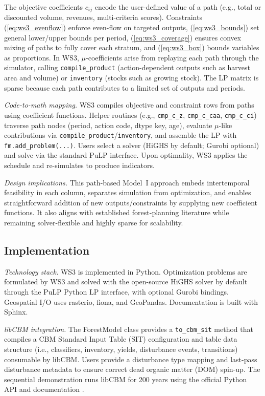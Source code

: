 \documentclass[review]{elsarticle}
\begin{document}
The objective coefficients $c_{ij}$ encode the user-defined value of a path (e.g., total or discounted volume, revenues, multi-criteria scores). Constraints (\ref{eq:ws3_evenflow}) enforce even-flow on targeted outputs, (\ref{eq:ws3_bounds}) set general lower/upper bounds per period, (\ref{eq:ws3_coverage}) ensures convex mixing of paths to fully cover each stratum, and (\ref{eq:ws3_box}) bounds variables as proportions. In WS3, $\mu$-coefficients arise from replaying each path through the simulator, calling \texttt{compile\_product} (action-dependent outputs such as harvest area and volume) or \texttt{inventory} (stocks such as growing stock). The LP matrix is sparse because each path contributes to a limited set of outputs and periods.

\emph{Code-to-math mapping.} WS3 compiles objective and constraint rows from paths using coefficient functions. Helper routines (e.g., \texttt{cmp\_c\_z}, \texttt{cmp\_c\_caa}, \texttt{cmp\_c\_ci}) traverse path nodes (period, action code, dtype key, age), evaluate $\mu$-like contributions via \texttt{compile\_product}/\texttt{inventory}, and assemble the LP with \texttt{fm.add\_problem(...)}. Users select a solver (HiGHS by default; Gurobi optional) and solve via the standard PuLP interface. Upon optimality, WS3 applies the schedule and re-simulates to produce indicators.

\emph{Design implications.} This path-based Model~I approach embeds intertemporal feasibility in each column, separates simulation from optimization, and enables straightforward addition of new outputs/constraints by supplying new coefficient functions. It also aligns with established forest-planning literature while remaining solver-flexible and highly sparse for scalability.

\subsection{Implementation}
\emph{Technology stack.} WS3 is implemented in Python. Optimization problems are formulated by WS3 and solved with the open-source HiGHS \citep{highs} solver by default through the PuLP \citep{pulp} Python LP interface, with optional Gurobi \citep{gurobi} bindings. Geospatial I/O uses rasterio, fiona, and GeoPandas. Documentation is built with Sphinx.

\emph{libCBM integration.} The ForestModel class provides a \texttt{to\_cbm\_sit} method that compiles a CBM Standard Input Table (SIT) configuration and table data structure (i.e., classifiers, inventory, yields, disturbance events, transitions) consumable by libCBM. Users provide a disturbance type mapping and last-pass disturbance metadata to ensure correct dead organic matter (DOM) spin-up. The sequential demonstration runs libCBM for 200 years using the official Python API and documentation \citep{libcbm_py_docs, libcbm_py_repo}.
\end{document}
